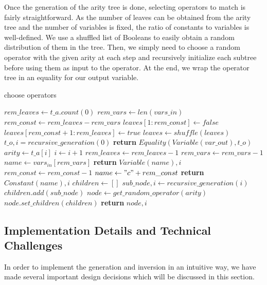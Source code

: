 \documentclass[sigplan,screen]{acmart}
\begin{document}
Once the generation of the arity tree is done, selecting operators to match is fairly straightforward. As the number of leaves can be obtained from the arity tree and the number of variables is fixed, the ratio of constants to variables is well-defined. We use a shuffled list of Booleans to easily obtain a random distribution of them in the tree. Then, we simply need to choose a random operator with the given arity at each step and recursively initialize each subtree before using them as input to the operator. At the end, we wrap the operator tree in an equality for our output variable.

\begin{algorithm} 
\caption{choose operators}
\label{alg:operatorselection}
\begin{algorithmic}
\State $rem\_leaves \gets t\_a.count(0)$
\State $rem\_vars \gets len(vars\_in)$
\State $rem\_const \gets rem\_leaves - rem\_vars$
\State $leaves[1:rem\_const] \gets false$
\State $leaves[rem\_const+1:rem\_leaves] \gets true$
\State $leaves \gets shuffle(leaves)$
\State $t\_o, i = recursive\_generation(0)$
\State \textbf{return} $Equality(Variable(var\_out), t\_o)$
\\
    \State $arity \gets t\_a[i]$
    \State $i \gets i + 1$
        \State $rem\_leaves \gets rem\_leaves - 1$
            \State $rem\_vars \gets rem\_vars - 1$
            \State $name \gets vars_{in}[rem\_vars]$
            \State \textbf{return} $Variable(name), i$
        \Else
            \State $rem\_const \gets rem\_const - 1$
            \State $name \gets "c" + rem\_const$
            \State \textbf{return} $Constant(name), i$
        \EndIf
    \Else
        \State $children \gets []$
            \State $sub\_node, i \gets recursive\_generation(i)$
            \State $children.add(sub\_node)$
        \EndFor
        \State $node \gets get\_random\_operator(arity)$
        \State $node.set\_children(children)$
        \State \textbf{return} $node, i$
    \EndIf
\EndProcedure
\end{algorithmic}
\end{algorithm}

\subsection{Implementation Details and Technical Challenges}
In order to implement the generation and inversion in an intuitive way, we have made several important design decisions which will be discussed in this section.
\end{document}
